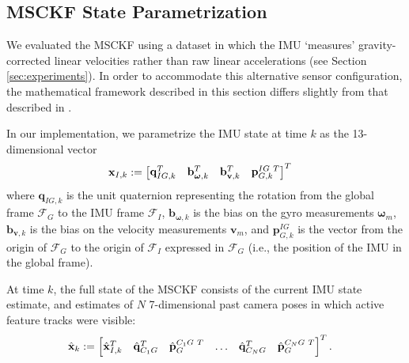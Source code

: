 \documentclass[letterpaper, 10 pt, conference]{ieeeconf}  %
\def\Vec#1{\mathbf{#1}}
\newcommand{\bbm}{\begin{bmatrix}}
\newcommand{\ebm}{\end{bmatrix}}
\begin{document}
\subsection{MSCKF State Parametrization}
We evaluated the MSCKF using a dataset in which the IMU `measures' gravity-corrected linear velocities rather than raw linear accelerations (see Section \ref{sec:experiments}).
In order to accommodate this alternative sensor configuration, the mathematical framework described in this section differs slightly from that described in \cite{Mourikis:2007:ICRA}.

In our implementation, we parametrize the IMU state at time $k$ as the 13-dimensional vector
\begin{align}
    \Vec{x}_{I,k} &:= \bbm \Vec{q}_{IG,k}^T & \Vec{b}_{\boldsymbol{\omega},k}^T & \Vec{b}_{\Vec{v},k}^T & \Vec{p}_{G,k}^{IG \hspace{0.3em} T} \ebm^T
\end{align}
where $\Vec{q}_{IG,k}$ is the unit quaternion representing the rotation from the global frame $\mathcal{F}_G$ to the IMU frame $\mathcal{F}_I$, $\Vec{b}_{\boldsymbol{\omega},k}$ is the bias on the gyro measurements $\boldsymbol{\omega}_m$, $\Vec{b}_{\Vec{v},k}$ is the bias on the velocity measurements $\Vec{v}_m$, and $\Vec{p}_{G,k}^{IG}$ is the vector from the origin of $\mathcal{F}_G$ to the origin of $\mathcal{F}_I$ expressed in $\mathcal{F}_G$ (i.e., the position of the IMU in the global frame).

At time $k$, the full state of the MSCKF consists of the current IMU state estimate, and estimates of $N$ 7-dimensional past camera poses in which active feature tracks were visible:
\begin{align*}
    \hat{\Vec{x}}_k &:= \bbm \hat{\Vec{x}}_{I,k}^T & \hat{\Vec{q}}_{C_1 G}^T & \hat{\Vec{p}}_G^{C_1 G \hspace{0.3em} T} & \hdots & \hat{\Vec{q}}_{C_N G}^T & \hat{\Vec{p}}_G^{C_N G \hspace{0.3em} T} \ebm ^T.
\end{align*}
\end{document}
